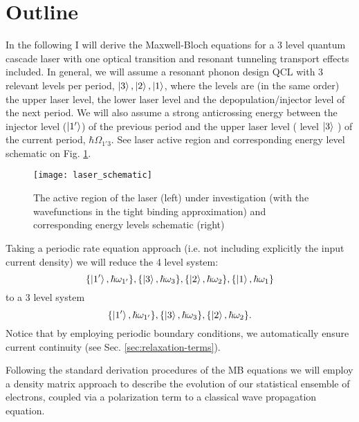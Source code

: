 \documentclass[10pt,english,fleqn]{article}%
\begin{document}
\section{Outline}
\label{sec:intro}
In the following I will derive the Maxwell-Bloch equations for a 3 level quantum cascade laser with one optical transition and resonant tunneling transport effects included. In general, we will assume a resonant phonon design QCL with 3 relevant levels per period, $\Ket{3} , \Ket{2}, \Ket{1}$, where the levels are (in the same order) 
the upper laser level, the lower laser level and the depopulation/injector level of the next period. We will also assume a strong anticrossing energy between the injector level ($\Ket{1'}$) of the previous period and the upper laser level ( level $\Ket{3}$ ) of the current period, $\hbar \Omega_{1'3}$. See laser active region and corresponding energy level schematic on Fig. \ref{fig:laser_schematic}.
\begin{figure}[h!]
\label{fig:laser_schematic}
\texttt{[image: laser\_schematic]} \caption{The active region of the laser (left) under investigation (with the wavefunctions in the tight binding approximation) and corresponding energy levels schematic (right)}
\end{figure}
\noindent
Taking a periodic rate equation approach (i.e. not including explicitly the input current density) we will reduce the 4 level system: 
$$\{\Ket{1'}, \hbar \omega_{1'} \} ,\{\Ket{3}, \hbar \omega_{3} \} ,\{\Ket{2}, \hbar \omega_{2} \} ,\{\Ket{1}, \hbar \omega_{1} \}$$
to a 3 level system 
$$\{\Ket{1'}, \hbar \omega_{1'} \} ,\{\Ket{3}, \hbar \omega_{3} \} ,\{\Ket{2}, \hbar \omega_{2} \}.$$
Notice that by employing periodic boundary conditions, we automatically ensure current continuity (see Sec. \ref{sec:relaxation-terms}). 

Following the standard derivation procedures of the MB equations we will employ a density matrix approach to describe the evolution of our statistical ensemble of electrons, coupled via a polarization term to a classical wave propagation equation. 
\end{document}
